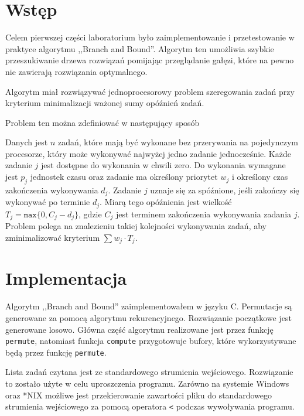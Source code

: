 \section{Wstęp} %
  \label{sec:wstep}

  Celem pierwszej części laboratorium było zaimplementowanie i przetestowanie
  w praktyce algorytmu ,,Branch and Bound''. Algorytm ten umożliwia szybkie
  przeszukiwanie drzewa rozwiązań pomijając przeglądanie gałęzi, które na pewno
  nie zawierają rozwiązania optymalnego.

  Algorytm miał rozwiązywać jednoprocesorowy problem szeregowania zadań przy
  kryterium minimalizacji ważonej sumy opóźnień zadań.

  Problem ten można zdefiniować w następujący sposób

  Danych jest $n$ zadań, które mają być wykonane bez przerywania na pojedynczym
  procesorze, który może wykonywać najwyżej jedno zadanie jednocześnie.
  Każde zadanie $j$ jest dostępne do wykonania w chwili zero. Do wykonania
  wymagane jest $p_j$ jednostek czasu oraz zadanie ma określony priorytet $w_j$
  i określony czas zakończenia wykonywania $d_j$.
  Zadanie $j$ uznaje się za spóźnione, jeśli zakończy się wykonywać po terminie
  $d_j$. Miarą tego opóźnienia jest wielkość $T_j = \texttt{max}\{0, C_j - d_j\}$,
  gdzie $C_j$ jest terminem zakończenia wykonywania zadania $j$. Problem polega
  na znalezieniu takiej kolejności wykonywania zadań, aby zminimalizować
  kryterium $\sum w_j \cdot T_j$.


\section{Implementacja} %
  \label{sec:impl}

  Algorytm ,,Branch and Bound'' zaimplementowałem w języku C. Permutacje są
  generowane za pomocą algorytmu rekurencyjnego. Rozwiązanie początkowe jest
  generowane losowo. Główna część algorytmu realizowane jest przez funkcję
  \texttt{permute}, natomiast funkcja \texttt{compute} przygotowuje bufory,
  które wykorzystywane będą przez funkcję \texttt{permute}.

  Lista zadań czytana jest ze standardowego strumienia wejściowego. Rozwiązanie
  to zostało użyte w celu uproszczenia programu. Zarówno na systemie Windows
  oraz *NIX możliwe jest przekierowanie zawartości pliku do standardowego
  strumienia wejściowego za pomocą operatora \texttt{<} podczas wywoływania
  programu.

